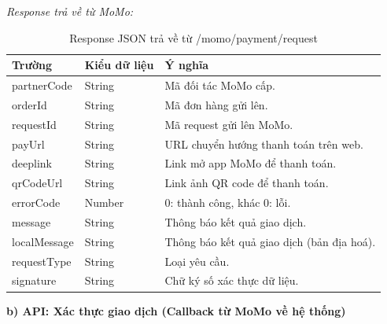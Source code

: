 \textit{Response trả về từ MoMo:}
\begin{table}[H]
    \centering
    \caption{Response JSON trả về từ /momo/payment/request}
    \begin{tabular}{|p{4cm}|p{2.5cm}|p{7cm}|}
        \hline
        \textbf{Trường} & \textbf{Kiểu dữ liệu} & \textbf{Ý nghĩa} \\
        \hline
        partnerCode & String & Mã đối tác MoMo cấp. \\
        \hline
        orderId & String & Mã đơn hàng gửi lên. \\
        \hline
        requestId & String & Mã request gửi lên MoMo. \\
        \hline
        payUrl & String & URL chuyển hướng thanh toán trên web. \\
        \hline
        deeplink & String & Link mở app MoMo để thanh toán. \\
        \hline
        qrCodeUrl & String & Link ảnh QR code để thanh toán. \\
        \hline
        errorCode & Number & 0: thành công, khác 0: lỗi. \\
        \hline
        message & String & Thông báo kết quả giao dịch. \\
        \hline
        localMessage & String & Thông báo kết quả giao dịch (bản địa hoá). \\
        \hline
        requestType & String & Loại yêu cầu. \\
        \hline
        signature & String & Chữ ký số xác thực dữ liệu. \\
        \hline
    \end{tabular}
\end{table}

\textbf{b) API: Xác thực giao dịch (Callback từ MoMo về hệ thống)}

